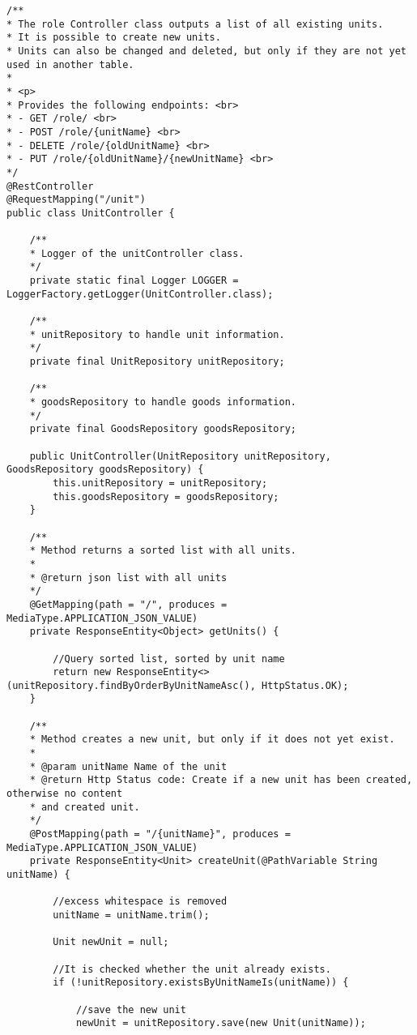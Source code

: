\lstset{language=java}
\begin{lstlisting}[frame=tb, caption={Das Listing zeigt die Klasse UnitController im Paket controller}, label={lst:UnitController}]
/**
* The role Controller class outputs a list of all existing units.
* It is possible to create new units.
* Units can also be changed and deleted, but only if they are not yet used in another table.
*
* <p>
* Provides the following endpoints: <br>
* - GET /role/ <br>
* - POST /role/{unitName} <br>
* - DELETE /role/{oldUnitName} <br>
* - PUT /role/{oldUnitName}/{newUnitName} <br>
*/
@RestController
@RequestMapping("/unit")
public class UnitController {
	
	/**
	* Logger of the unitController class.
	*/
	private static final Logger LOGGER = LoggerFactory.getLogger(UnitController.class);
	
	/**
	* unitRepository to handle unit information.
	*/
	private final UnitRepository unitRepository;
	
	/**
	* goodsRepository to handle goods information.
	*/
	private final GoodsRepository goodsRepository;
	
	public UnitController(UnitRepository unitRepository, GoodsRepository goodsRepository) {
		this.unitRepository = unitRepository;
		this.goodsRepository = goodsRepository;
	}
	
	/**
	* Method returns a sorted list with all units.
	*
	* @return json list with all units
	*/
	@GetMapping(path = "/", produces = MediaType.APPLICATION_JSON_VALUE)
	private ResponseEntity<Object> getUnits() {
		
		//Query sorted list, sorted by unit name
		return new ResponseEntity<>(unitRepository.findByOrderByUnitNameAsc(), HttpStatus.OK);
	}
	
	/**
	* Method creates a new unit, but only if it does not yet exist.
	*
	* @param unitName Name of the unit
	* @return Http Status code: Create if a new unit has been created, otherwise no content
	* and created unit.
	*/
	@PostMapping(path = "/{unitName}", produces = MediaType.APPLICATION_JSON_VALUE)
	private ResponseEntity<Unit> createUnit(@PathVariable String unitName) {
		
		//excess whitespace is removed
		unitName = unitName.trim();
		
		Unit newUnit = null;
		
		//It is checked whether the unit already exists.
		if (!unitRepository.existsByUnitNameIs(unitName)) {
			
			//save the new unit
			newUnit = unitRepository.save(new Unit(unitName));
			

\end{lstlisting}
